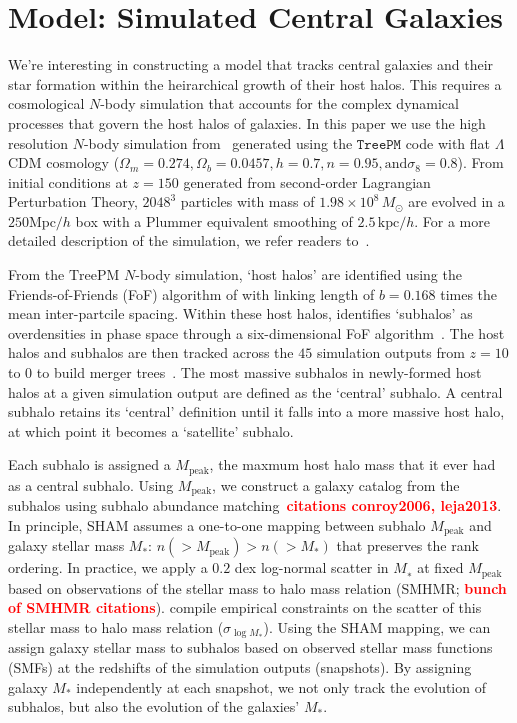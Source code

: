 \documentclass[12pt, letterpaper, preprint]{aastex}
\newcommand{\todo}[1]{{\bf \textcolor{red}{#1}}}
\begin{document}
\section{Model: Simulated Central Galaxies} \label{sec:sim}
We're interesting in constructing a model that tracks central galaxies and 
their star formation within the heirarchical growth of their host halos. This 
requires a cosmological $N$-body simulation that accounts for the complex 
dynamical processes that govern the host halos of galaxies. In this paper 
we use the high resolution $N$-body simulation from~\cite{wetzel2013} generated 
using the \cite{white2002} $\mathtt{TreePM}$ code with flat $\Lambda$CDM cosmology 
($\Omega_m =0.274, \Omega_b = 0.0457, h = 0.7, n=0.95, \mathrm{and} \sigma_8 = 0.8$).
From initial conditions at $z = 150$ generated from second-order Lagrangian 
Perturbation Theory, $2048^3$ particles with mass of $1.98 \times 10^8\,M_\odot$ are 
evolved in a $250 \mathrm{Mpc}/h$ box with a Plummer equivalent smoothing of $2.5\,\mathrm{kpc}/h$. 
For a more detailed description of the simulation, we refer readers to~\cite{wetzel2013, wetzel2014}.

From the $\mathrm{TreePM}$ $N$-body simulation, `host halos' are identified using the
Friends-of-Friends (FoF) algorithm of \cite{davis1985} with linking length of $b = 0.168$
times the mean inter-partcile spacing. Within these host halos, \cite{wetzel2013} identifies  
`subhalos' as overdensities in phase space through a six-dimensional FoF 
algorithm~\citep[FoF6D][]{white2010}. The host halos and subhalos are 
then tracked across the $45$ simulation outputs from $z = 10$ to $0$ to 
build merger trees~\citep{wetzel2009,wetzel2010}. The most massive 
subhalos in newly-formed host halos at a given simulation output are defined 
as the `central' subhalo. A central subhalo retains its `central' definition 
until it falls into a more massive host halo, at which point it becomes a 
`satellite' subhalo. 

Each subhalo is assigned a $M_\mathrm{peak}$, the maxmum host halo mass that 
it ever had as a central subhalo. Using $M_\mathrm{peak}$, we construct a galaxy 
catalog from the subhalos using subhalo abundance matching~\citep[SHAM;][]{vale2006,yang2009,wetzel2012,wetzel2013,wetzel2014,hahn2017a}\todo{citations conroy2006, leja2013}. 
In principle, SHAM assumes a one-to-one mapping between subhalo 
$M_\mathrm{peak}$ and galaxy stellar mass $M_*$: $n(> M_\mathrm{peak}) > n(> M_*)$
that preserves the rank ordering. In practice, we apply a $0.2$ dex log-normal 
scatter in $M_∗$ at fixed $M_\mathrm{peak}$ based on observations of the stellar 
mass to halo mass relation (SMHMR; \todo{bunch of SMHMR citations}). \cite{gu2016} 
compile empirical constraints on the scatter of this stellar mass to halo 
mass relation ($\sigma_{\log M_*}$). Using the SHAM mapping, we can 
assign galaxy stellar mass to subhalos based on observed stellar mass 
functions (SMFs) at the redshifts of the simulation outputs (snapshots). 
By assigning galaxy $M_*$ independently at each snapshot, we not only track 
the evolution of subhalos, but also the evolution of the galaxies' $M_*$. 
\end{document}

